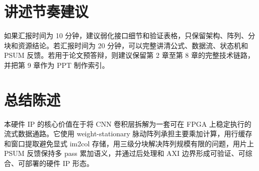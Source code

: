 \documentclass[fontset=fandol,ugly,language=chinese]{pkuthss}
\begin{document}
\section{讲述节奏建议}

如果汇报时间为 10 分钟，建议弱化接口细节和验证表格，只保留架构、阵列、分块和资源结论。若汇报时间为 20 分钟，可以完整讲清公式、数据流、状态机和 PSUM 反馈。若用于论文预答辩，则建议保留第 2 章至第 8 章的完整技术链路，并把第 9 章作为 PPT 制作索引。

\section{总结陈述}

本硬件 IP 的核心价值在于将 CNN 卷积层拆解为一套可在 FPGA 上稳定执行的流式数据通路。它使用 weight-stationary 脉动阵列承担主要乘加计算，用行缓存和窗口提取避免显式 im2col 存储，用三级分块解决阵列规模有限的问题，用片上 PSUM 反馈保持多 pass 累加语义，并通过后处理和 AXI 边界形成可验证、可综合、可部署的硬件 IP 形态。
\end{document}
